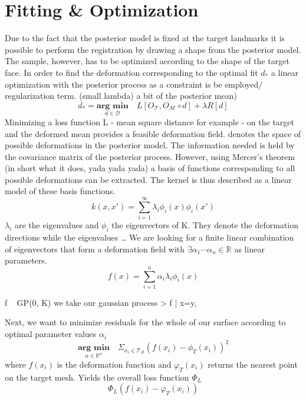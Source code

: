 \section{Fitting \& Optimization}
Due to the fact that the posterior model is fixed at the target landmarks it is possible to perform the registration by drawing a shape from the posterior model. The sample, however, has to be optimized according to the shape of the target face. 
In order to find the deformation corresponding to the optimal fit $d_{*}$ a linear optimization with the posterior process as a constraint is be employed/ regularization term. (small lambda) a bit of the posterior mean) 
\begin{equation}
d_{*} = \underset{d \in \mathcal{D}}{\textbf{arg min}}\quad L[O_{\mathcal{T}}, O_{\mathcal{M}} \circ d]+\lambda R[d]
\end{equation}
Minimizing a loss function L - mean square distance for example - on the target and the deformed mean provides a feasible deformation field. 
 denotes the space of possible deformations in the posterior model. The information needed is held by the covariance matrix of the posterior process. However, using Mercer's theorem (in short what it does, yada yada yada) a basis of functions corresponding to all possible deformations can be extracted. The kernel is thus described as a linear model of these basis functions.    
\begin{equation}
k(x,x') = \sum^{\infty}_{i=1}\lambda_{i}\phi_{i}(x)\phi_{i}(x')
\end{equation}
$\lambda_{i}$ are the eigenvalues and $\phi_{i}$ the eigenvectors of K. They denote the deformation directions while the eigenvalues \ldots
We are looking for a finite linear combination of eigenvectors that form a deformation field with $\exists \alpha_{1} \cdots \alpha_{n} \in \mathbb{R}$ as linear parameters.
\begin{equation}
f(x) = \sum^{n}_{i=1} \alpha_{i}\lambda_{i}\phi_{i}(x)
\end{equation}

f ~ GP(0, K) we take our gaussian process
> f | x=y, 

Next, we want to minimize residuals for the whole of our surface according to optimal parameter values $\alpha_{i}$ 
\begin{equation}
    \underset{\alpha \in \mathbb{R}^n}{\textbf{arg min}}\quad \Sigma_{x_{i} \in \mathcal{T}_{R}} (f(x_{i}) - \phi_{T}(x_{i}))^2
\end{equation}
where $f(x_{i})$ is the deformation function and $\varphi_{T}(x_{i})$ returns the nearest point on the target mesh. Yields the overall loss function $\Phi_{L}$ 
\begin{equation}
\Phi_{L}(f(x_{i})-\varphi_{T}(x_{i}))
\end{equation}


